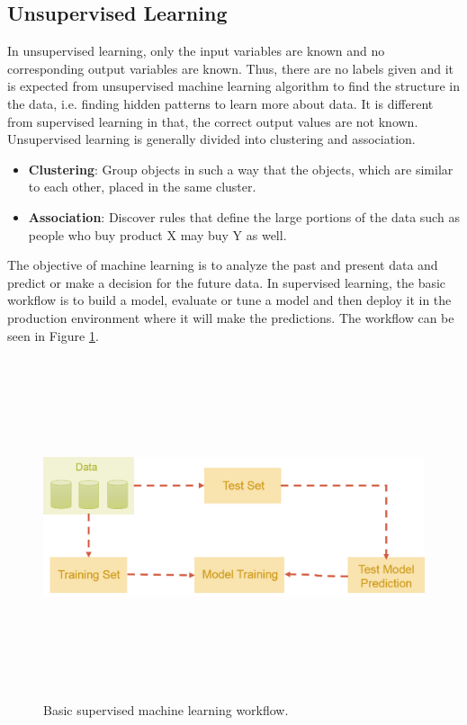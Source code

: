 \subsection{Unsupervised Learning}

In unsupervised learning, only the input variables are known and no corresponding output variables are known. Thus, there are no labels given and it is expected from unsupervised machine learning algorithm to find the structure in the data, i.e. finding hidden patterns to learn more about data. It is different from supervised learning in that, the correct output values are not known. Unsupervised learning is generally divided into clustering and association.

\begin{itemize}
	\item \textbf{Clustering}: Group objects in such a way that the objects, which are similar to each other, placed in the same cluster.
	\item \textbf{Association}: Discover rules that define the large portions of the data such as people who buy product X may buy Y as well.
\end{itemize}

The objective of machine learning is to analyze the past and present data and predict or make a decision for the future data. In supervised learning, the basic workflow is to build a model, evaluate or tune a model and then deploy it in the production environment where it will make the predictions. The workflow can be seen in Figure \ref{fig:basic-ml-model}.


\begin{figure}[htpb]
	\centering
	\includegraphics[width=12cm,height=10cm,keepaspectratio=true]{images/basic-ml-model.png}
	\caption{
		Basic supervised machine learning workflow.
	}
	\label{fig:basic-ml-model}
\end{figure}



